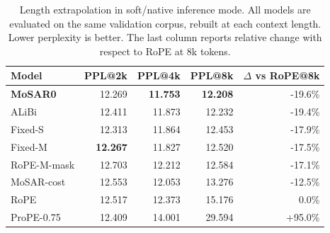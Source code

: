 \begin{table}[t]
\centering
\small
\setlength{\tabcolsep}{4pt}
\begin{tabular}{lrrrr}
\toprule
Model & PPL@2k & PPL@4k & PPL@8k & $\Delta$ vs RoPE@8k \\
\midrule
\textbf{MoSAR0} & 12.269 & \textbf{11.753} & \textbf{12.208} & -19.6\% \\
ALiBi & 12.411 & 11.873 & 12.232 & -19.4\% \\
Fixed-S & 12.313 & 11.864 & 12.453 & -17.9\% \\
Fixed-M & \textbf{12.267} & 11.827 & 12.520 & -17.5\% \\
RoPE-M-mask & 12.703 & 12.212 & 12.584 & -17.1\% \\
MoSAR-cost & 12.553 & 12.053 & 13.276 & -12.5\% \\
RoPE & 12.517 & 12.373 & 15.176 & 0.0\% \\
ProPE-0.75 & 12.409 & 14.001 & 29.594 & +95.0\% \\
\bottomrule
\end{tabular}
\caption{
Length extrapolation in soft/native inference mode. 
All models are evaluated on the same validation corpus, rebuilt at each context length. 
Lower perplexity is better. The last column reports relative change with respect to RoPE at 8k tokens.
}
\label{tab:length-extrapolation-soft}
\end{table}
